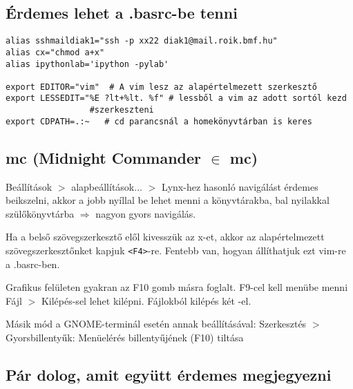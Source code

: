 \documentclass[a4paper]{article}
\newcommand{\code}{\texttt}
\newcommand{\Esc}{\framebox{\texttt{Esc}}}
\begin{document}

\subsection{Érdemes lehet a .basrc-be tenni}

\hspace{1 ex}
\begin{Verbatim}[label=\fbox{~/.bashrc}, frame=single]
alias sshmaildiak1="ssh -p xx22 diak1@mail.roik.bmf.hu"
alias cx="chmod a+x"
alias ipythonlab='ipython -pylab'

export EDITOR="vim"  # A vim lesz az alapértelmezett szerkesztő
export LESSEDIT="%E ?lt+%lt. %f" # lessből a vim az adott sortól kezd
				 #szerkeszteni
export CDPATH=.:~   # cd parancsnál a homekönyvtárban is keres
\end{Verbatim}

\subsection{mc (Midnight Commander $\in$ mc)}

Beállítások $>$ alapbeállítások... $>$ Lynx-hez hasonló navigálást
érdemes beikszelni, akkor a jobb nyíllal be lehet menni a
könyvtárakba, bal nyilakkal szülőkönyvtárba $\Rightarrow$ nagyon gyors
navigálás.

Ha a belső szövegszerkesztő elől kivesszük az x-et, akkor az
alapértelmezett szövegszerkesztőnket kapjuk \verb+<F4>+-re. Fentebb van,
hogyan állíthatjuk ezt vim-re a .basrc-ben.

Grafikus felületen gyakran az F10 gomb másra foglalt. F9-cel kell
menübe menni Fájl $>$ Kilépés-sel lehet kilépni. Fájlokból kilépés két
\Esc-el.

Másik mód a GNOME-terminál esetén annak beállításával: Szerkesztés $>$
Gyorsbillentyűk: Menüelérés billentyűjének (F10) tiltása

\subsection{Pár dolog, amit együtt érdemes megjegyezni}
\end{document}
